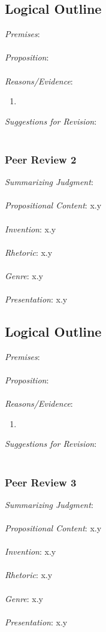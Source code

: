 \documentclass[12pt]{article}
\begin{document}
\subsection*{Logical Outline}
\noindent \textit{Premises}: \\ \\
\textit{Proposition}: \\ \\
\textit{Reasons/Evidence}:
\begin{enumerate}
	\item \ %
\end{enumerate}
\textit{Suggestions for Revision}: \\\\

\subsubsection*{Peer Review 2}
\noindent \textit{Summarizing Judgment}: \\ \\
\textit{Propositional Content}: x.y \\ \\ %
\textit{Invention}: x.y \\ \\
\textit{Rhetoric}: x.y \\ \\
\textit{Genre}: x.y \\ \\
\textit{Presentation}: x.y
\subsection*{Logical Outline}
\noindent \textit{Premises}: \\ \\
\textit{Proposition}: \\ \\
\textit{Reasons/Evidence}:
\begin{enumerate}
	\item \ %
\end{enumerate}
\textit{Suggestions for Revision}: \\\\

\subsubsection*{Peer Review 3}
\noindent \textit{Summarizing Judgment}: \\ \\
\textit{Propositional Content}: x.y \\ \\ %
\textit{Invention}: x.y \\ \\
\textit{Rhetoric}: x.y \\ \\
\textit{Genre}: x.y \\ \\
\textit{Presentation}: x.y
\end{document}
